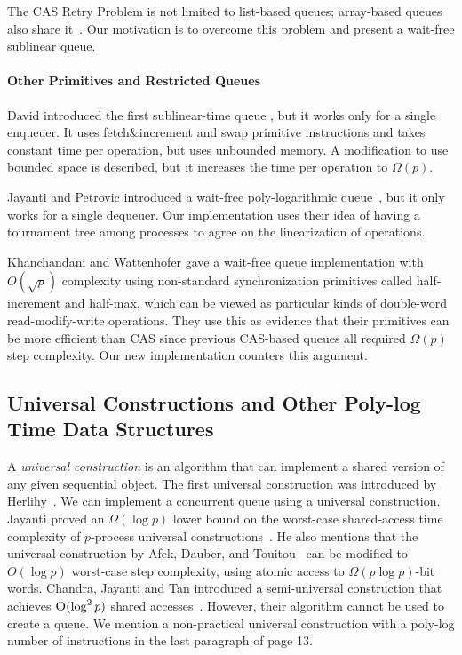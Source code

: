 The CAS Retry Problem is not limited to list-based queues; array-based
queues also share
it~\cite{DBLP:conf/iceccs/ColvinG05,DBLP:conf/icdcn/Shafiei09,DBLP:conf/spaa/TsigasZ01}.
Our motivation is to overcome this problem and present a wait-free
sublinear queue. 


\paragraph{Other Primitives and Restricted Queues}

David introduced the first sublinear-time queue
\cite{DBLP:conf/wdag/David04}, but it works only for a single enqueuer.
It uses fetch\&increment and swap primitive instructions and takes constant time per operation, but
uses unbounded memory.  A modification to use bounded space
is described, but it increases the time per operation to $\Omega(p)$.

Jayanti and Petrovic introduced a wait-free poly-logarithmic
queue~\cite{DBLP:conf/fsttcs/JayantiP05}, but it only works for a single dequeuer. 
Our implementation uses their idea of having
a tournament tree among processes to agree on the linearization of
operations.

Khanchandani and Wattenhofer \cite{KW18} gave a wait-free queue implementation
with $O(\sqrt{p})$ complexity using non-standard synchronization primitives
called half-increment and half-max, which can be viewed as particular kinds of
double-word read-modify-write operations.
They use this as evidence that their primitives can be more efficient than CAS
since previous CAS-based queues all required $\Omega(p)$ step complexity.
Our new implementation counters this argument.


\subsection{Universal Constructions and Other Poly-log Time Data Structures}
A \textit{universal construction} is an algorithm that can implement a
shared version of any given sequential object. The first universal
construction was introduced by
Herlihy~\cite{10.1145/114005.102808}. We can implement a concurrent
queue using a universal construction. Jayanti proved an $\Omega(\log
p)$ lower bound on the worst-case shared-access time complexity of
$p$-process universal
constructions~\cite{DBLP:conf/podc/Jayanti98a}. He also mentions that
the universal construction by Afek, Dauber, and
Touitou~\cite{DBLP:conf/stoc/AfekDT95} can be modified to $O(\log p)$
worst-case step complexity, using atomic access to $\Omega(p \log
p)$-bit words. Chandra, Jayanti and Tan introduced a semi-universal
construction that achieves $\textsc{O}(\log^2 p)$ shared
accesses~\cite{DBLP:conf/podc/ChandraJT98}. However, their algorithm
cannot be used to create a queue. We mention a non-practical universal
construction with a poly-log number of  instructions in the
last paragraph of page 13. 

